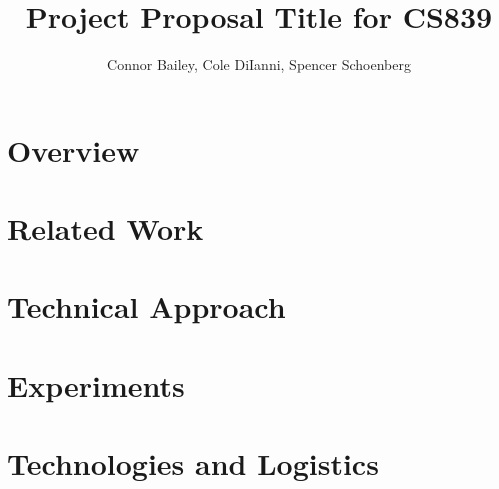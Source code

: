\documentclass[12pt]{article}
\title{Project Proposal Title for CS839}
\author{Connor Bailey, Cole DiIanni, Spencer Schoenberg}
\begin{document}
\maketitle

\begin{abstract}

\end{abstract}

\section*{Overview}

\section*{Related Work}

\section*{Technical Approach}

\section*{Experiments}

\section*{Technologies and Logistics}




\nocite{*}
\end{document}
